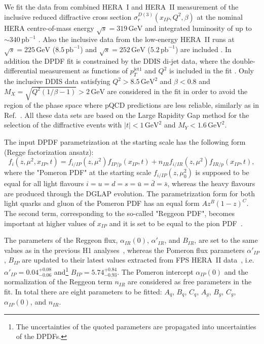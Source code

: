 \documentclass{PoS}
\newcommand{\IP}{I\!\!P}
\newcommand{\IR}{I\!\!R}
\newcommand{\xpom}{x_{\IP}}
\newcommand{\GeV}{\ensuremath{\mathrm{GeV}}\xspace}
\newcommand{\GeVsq}{\ensuremath{\mathrm{GeV}^2}\xspace}
\begin{document}
We fit the data from combined HERA~I and HERA~II measurement of the inclusive reduced diffractive cross section $\sigma_r^{D(3)}(\xpom, Q^2, \beta)$  at the nominal HERA centre-of-mass energy $\sqrt{s} = 319\,\GeV$ and integrated luminosity of up to $\sim\!\! 340\,\text{pb}^{-1}$  \cite{Aaron:2012ad}.
Also the inclusive data from the low-energy HERA~II runs at $\sqrt{s} = 225\,\GeV$ ($8.5\,\text{pb}^{-1}$) and $\sqrt{s} = 252\,\GeV$ ($5.2\,\text{pb}^{-1}$) are included \cite{Aaron:2012zz}.
In addition the DPDF fit is constrained by the DDIS di-jet data, where the double-differential measurement as functions of $p_T^{\mathrm{jet}1}$ and $Q^2$ is included in the fit \cite{Andreev:2014yra}.
Only the inclusive DDIS data satisfying $Q^2 > 8.5\, \GeVsq$ and $\beta < 0.8$ and $M_X = \sqrt{Q^2(1/\beta - 1)} > 2\,\GeV$ are considered in the fit in order to avoid the region of the phase space where pQCD predictions are less reliable, similarly as in Ref.~\cite{Aktas:2006hy}.
All these data sets are based on the Large Rapidity Gap method for the selection of the diffractive events with $|t| < 1\,\GeVsq$ and $M_Y < 1.6\,\GeVsq$.


The input DPDF parametrization at the starting scale has the following form (Regge factorization ansatz):
\begin{equation}
f_i (z, \mu^2, \xpom, t) = f_{i/\IP} (z, \mu^2) f_{\IP/p} (\xpom, t) + n_{\IR} f_{i/\IR} (z, \mu^2) f_{\IR/p} (\xpom, t),
\end{equation}
where the "Pomeron PDF" at the starting scale  $f_{i/\IP}(z, \mu_0^2)$ is supposed to be equal for all light flavours $i=u=d=s = \bar{u} = \bar{d} = \bar{s}$, whereas the heavy flavours are produced through the DGLAP evolution.
The parametrization form for both light quarks and gluon of the Pomeron PDF has an equal form $A z^B (1-z)^C$.
The second term, corresponding to the so-called "Reggeon PDF", becomes important at higher values of $\xpom$ and it is set to be equal to the pion PDF~\cite{Owens:1984zj}.

The parameters of the Reggeon flux, $\alpha_{\IR}(0)$,  $\alpha'_{\IR}$, and $B_{\IR}$,  are set to the same values as in the previous H1 analyses~\cite{Aktas:2006hy,Aktas:2007bv}, whereas the Pomeron flux parameters $\alpha'_{\IP}$, $B_{\IP}$ are updated to their latest values extracted from FPS HERA~II data~\cite{Aaron:2010aa}, i.e. $\alpha'_{\IP} = 0.04^{+0.08}_{-0.06}$ and\footnote{The uncertainties of the quoted parameters are propagated into uncertainties of the DPDFs.} $B_{\IP} = 5.74^{+0.84}_{-0.93}$.
The Pomeron intercept $\alpha_{\IP}(0)$ and the normalization of the Reggeon term $n_{\IR}$ are considered as free parameters in the fit.
In total there are eight parameters to be fitted: $A_q$, $B_q$, $C_q$, $A_g$, $B_g$, $C_g$, $\alpha_{\IP}(0)$, and $n_{\IR}$.
\end{document}
